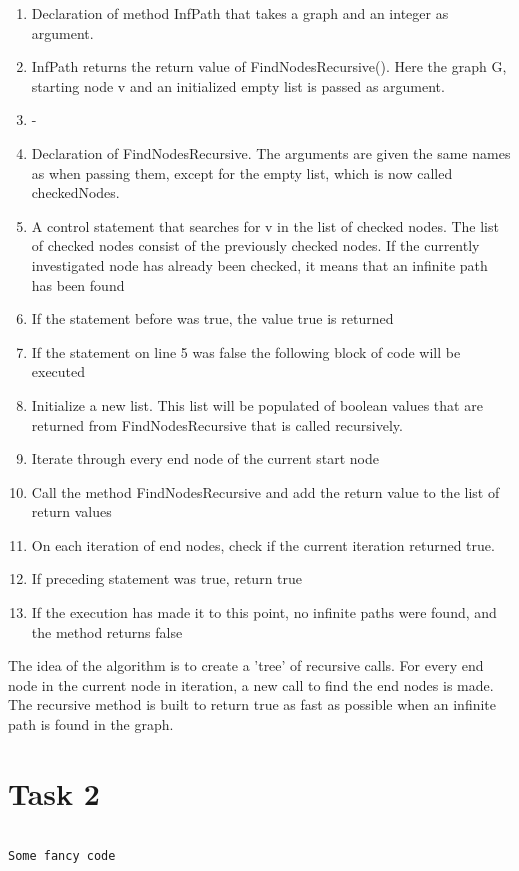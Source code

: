 \documentclass[]{article}
\begin{document}
\begin{enumerate}
	\item Declaration of method InfPath that takes a graph and an integer as argument.
	\item InfPath returns the return value of FindNodesRecursive(). Here the graph G, starting node v and an initialized
	empty list is passed as argument.
	\item -
	\item Declaration of FindNodesRecursive. The arguments are given the same names as when passing them, except for
	the empty list, which is now called checkedNodes.
	\item A control statement that searches for v in the list of checked nodes. The list of checked nodes consist of the
	previously checked nodes. If the currently investigated node has already been checked, it means that an
	infinite path has been found
	\item If the statement before was true, the value true is returned
	\item If the statement on line 5 was false the following block of code will be executed
	\item Initialize a new list. This list will be populated of boolean values that are returned from FindNodesRecursive
	that is called recursively.
	\item Iterate through every end node of the current start node
	\item Call the method FindNodesRecursive and add the return value to the list of return values
	\item On each iteration of end nodes, check if the current iteration returned true.
	\item If preceding statement was true, return true
	\item If the execution has made it to this point, no infinite paths were found, and the method returns false
\end{enumerate}

The idea of the algorithm is to create a 'tree' of recursive calls. For every end node in the current node in iteration, a new call to find the end nodes is made. The recursive method is built to return true as fast as possible when an infinite path
is found in the graph.

\newpage
\section*{Task 2}

\begin{lstlisting}

Some fancy code

\end{lstlisting}
\end{document}
